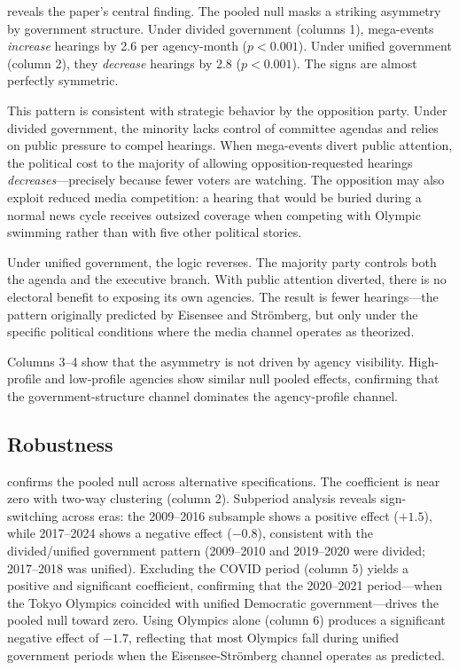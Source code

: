 \documentclass[12pt]{article}
\begin{document}


 reveals the paper's central finding. The pooled null masks a striking asymmetry by government structure. Under divided government (columns 1), mega-events \textit{increase} hearings by 2.6 per agency-month ($p < 0.001$). Under unified government (column 2), they \textit{decrease} hearings by 2.8 ($p < 0.001$). The signs are almost perfectly symmetric.

This pattern is consistent with strategic behavior by the opposition party. Under divided government, the minority lacks control of committee agendas and relies on public pressure to compel hearings. When mega-events divert public attention, the political cost to the majority of allowing opposition-requested hearings \textit{decreases}---precisely because fewer voters are watching. The opposition may also exploit reduced media competition: a hearing that would be buried during a normal news cycle receives outsized coverage when competing with Olympic swimming rather than with five other political stories.

Under unified government, the logic reverses. The majority party controls both the agenda and the executive branch. With public attention diverted, there is no electoral benefit to exposing its own agencies. The result is fewer hearings---the pattern originally predicted by Eisensee and Str\"{o}mberg, but only under the specific political conditions where the media channel operates as theorized.

Columns 3--4 show that the asymmetry is not driven by agency visibility. High-profile and low-profile agencies show similar null pooled effects, confirming that the government-structure channel dominates the agency-profile channel.

\subsection{Robustness}



 confirms the pooled null across alternative specifications. The coefficient is near zero with two-way clustering (column 2). Subperiod analysis reveals sign-switching across eras: the 2009--2016 subsample shows a positive effect ($+1.5$), while 2017--2024 shows a negative effect ($-0.8$), consistent with the divided/unified government pattern (2009--2010 and 2019--2020 were divided; 2017--2018 was unified). Excluding the COVID period (column 5) yields a positive and significant coefficient, confirming that the 2020--2021 period---when the Tokyo Olympics coincided with unified Democratic government---drives the pooled null toward zero. Using Olympics alone (column 6) produces a significant negative effect of $-1.7$, reflecting that most Olympics fall during unified government periods when the Eisensee-Str\"{o}mberg channel operates as predicted.
\end{document}
